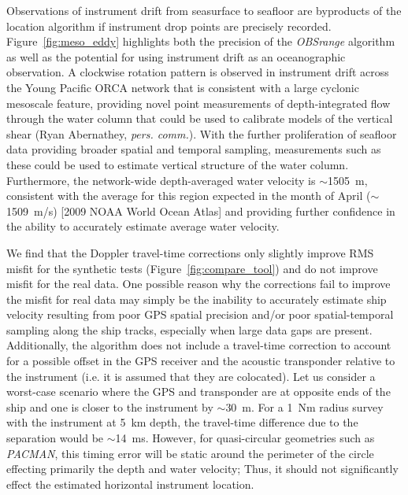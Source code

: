 Observations of instrument drift from seasurface to seafloor are byproducts of the location algorithm if instrument drop points are precisely recorded. Figure~\ref{fig:meso_eddy} highlights both the precision of the \textit{OBSrange} algorithm as well as the potential for using instrument drift as an oceanographic observation. A clockwise rotation pattern is observed in instrument drift across the Young Pacific ORCA network that is consistent with a large cyclonic mesoscale feature, providing novel point measurements of depth-integrated flow through the water column that could be used to calibrate models of the vertical shear (Ryan Abernathey, \textit{pers. comm.}). With the further proliferation of seafloor data providing broader spatial and temporal sampling, measurements such as these could be used to estimate vertical structure of the water column. Furthermore, the network-wide depth-averaged water velocity is $\sim$1505~m, consistent with the average for this region expected in the month of April ($\sim$1509~m/s) [2009 NOAA World Ocean Atlas] and providing further confidence in the ability to accurately estimate average water velocity.

We find that the Doppler travel-time corrections only slightly improve RMS misfit for the synthetic tests (Figure~\ref{fig:compare_tool}) and do not improve misfit for the real data. One possible reason why the corrections fail to improve the misfit for real data may simply be the inability to accurately estimate ship velocity resulting from poor GPS spatial precision and/or poor spatial-temporal sampling along the ship tracks, especially when large data gaps are present. Additionally, the algorithm does not include a travel-time correction to account for a possible offset in the GPS receiver and the acoustic transponder relative to the instrument (i.e. it is assumed that they are colocated). Let us consider a worst-case scenario where the GPS and transponder are at opposite ends of the ship and one is closer to the instrument by $\sim$30~m. For a 1~Nm radius survey with the instrument at 5~km depth, the travel-time difference due to the separation would be $\sim$14~ms. However, for quasi-circular geometries such as \textit{PACMAN}, this timing error will be static around the perimeter of the circle effecting primarily the depth and water velocity; Thus, it should not significantly effect the estimated horizontal instrument location.